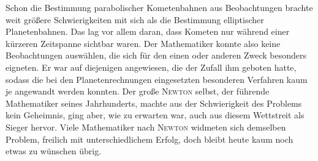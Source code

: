 Schon die Bestimmung parabolischer Kometenbahnen aus Beobachtungen brachte weit größere Schwierigkeiten mit sich als die Bestimmung elliptischer Planetenbahnen. Das lag vor allem daran, dass Kometen nur während einer kürzeren
Zeitspanne sichtbar waren. Der Mathematiker konnte also keine Beobachtungen auswählen, die sich für den einen oder anderen Zweck besonders eigneten. Er war auf diejenigen angewiesen, die der Zufall ihm geboten hatte, sodass die bei den Planetenrechnungen eingesetzten besonderen Verfahren kaum je angewandt werden konnten. Der große \textsc{Newton} selbst, der führende Mathematiker seines Jahrhunderts, machte aus der Schwierigkeit des Problems kein Geheimnis, ging aber, wie zu erwarten war, auch aus diesem Wettstreit als Sieger hervor. Viele Mathematiker nach \textsc{Newton} widmeten sich demselben Problem, freilich mit unterschiedlichem Erfolg, doch bleibt heute kaum noch etwas zu wünschen übrig.

